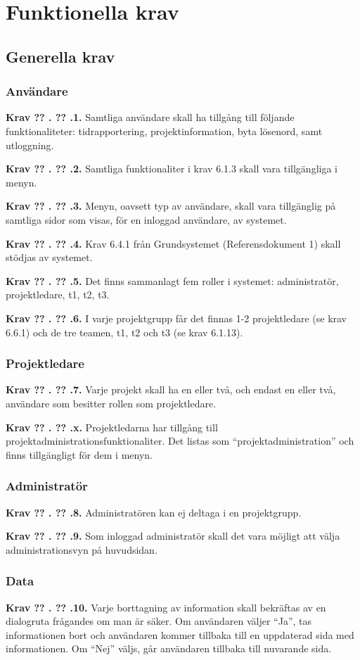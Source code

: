 \documentclass[a4paper]{article}
\newcommand\getcurrentref[1]{%
 \ifnumequal{\value{#1}}{0}
  {??}
  {\the\value{#1}}%
}
\newcommand\requirement[2]{
	\numberedrow{Krav}{#1}{#2}
}
\newcommand\numberedrow[3]{
	\noindent
	\textbf{#1 \getcurrentref{section}.\getcurrentref{subsection}.#2.} #3
	
}
\begin{document}

\section{Funktionella krav}
	\subsection{Generella krav}
		\label{krav-funk-gen}
		\subsubsection*{Användare}
		\requirement{1}{Samtliga användare skall ha tillgång till följande funktionaliteter: tidrapportering, projektinformation, byta lösenord, samt utloggning.}
		
		\requirement{2}{Samtliga funktionaliter i krav 6.1.3 skall vara tillgängliga i menyn.}
		\requirement{3}{Menyn, oavsett typ av användare, skall vara tillgänglig på samtliga sidor som visas, för en inloggad användare, av systemet.}
		\requirement{4}{Krav 6.4.1 från Grundsystemet (Referensdokument 1) skall stödjas av systemet.}
		\requirement{5}{Det finns sammanlagt fem roller i systemet: administratör, projektledare, t1, t2, t3.}
		\requirement{6}{I varje projektgrupp får det finnas 1-2 projektledare (se krav 6.6.1) och de tre teamen, t1, t2 och t3 (se krav 6.1.13).}
		\subsubsection*{Projektledare}
		\requirement{7}{Varje projekt skall ha en eller två, och endast en eller två, användare som besitter rollen som projektledare.}
\requirement{x}{Projektledarna har tillgång till projektadministrationsfunktionaliter. Det listas som ``projektadministration'' och finns tillgängligt för dem i menyn.}
		\subsubsection*{Administratör}
		\requirement{8}{Administratören kan ej deltaga i en projektgrupp. }
		\requirement{9}{Som inloggad administratör skall det vara möjligt att välja administrationsvyn på huvudsidan.}
		\subsubsection*{Data}
		\requirement{10}{Varje borttagning av information skall bekräftas av en dialogruta frågandes om man är säker. Om användaren väljer ``Ja'', tas informationen bort och användaren kommer tillbaka till en uppdaterad sida med informationen. Om ``Nej'' väljs, går användaren tillbaka till nuvarande sida.}
\end{document}

